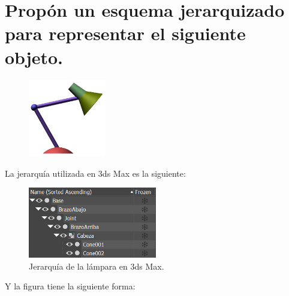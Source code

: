 \documentclass{article}
\begin{document}
\section{Propón un esquema jerarquizado para representar el siguiente objeto.}

\begin{figure}[H]
    \centering
    \includegraphics[width=0.3\textwidth]{imagenes/lamp.jpg}
 \end{figure}    


La jerarquía utilizada en 3ds Max es la siguiente:

\begin{figure}[H]
    \centering
    \includegraphics[width=0.5\textwidth]{imagenes/lampjerar.jpg}
    \caption{Jerarquía de la lámpara en 3ds Max.}
 \end{figure}    

\newpage

Y la figura tiene la siguiente forma:
\end{document}
